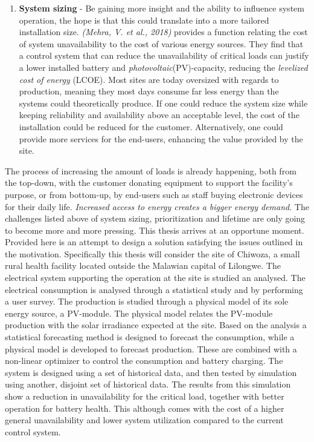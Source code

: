 \begin{enumerate}
    \item \textbf{System sizing}    -    Be gaining more insight and the ability to influence system operation, the hope is that this could translate into a more tailored installation size. \textit{(Mehra, V. et al., 2018)} provides a function relating the cost of system unavailability to the cost of various energy sources.\cite{Mehra2018-xs} They find that a control system that can reduce the unavailability of critical loads can justify a lower installed battery and \textit{photovoltaic}(PV)-capacity, reducing the \textit{levelized cost of energy} (LCOE). Most sites are today oversized with regards to production, meaning they most days consume far less energy than the systems could theoretically produce. If one could reduce the system size while keeping reliability and availability above an acceptable level, the cost of the installation could be reduced for the customer. Alternatively, one could provide more services for the end-users, enhancing the value provided by the site.
\end{enumerate}

The process of increasing the amount of loads is already happening, both from the top-down, with the customer donating equipment to support the facility's purpose, or from bottom-up, by end-users such as staff buying electronic devices for their daily life. \textit{Increased access to energy creates a bigger energy demand}. The challenges listed above of system sizing, prioritization and lifetime are only going to become more and more pressing. This thesis arrives at an opportune moment.\\


Provided here is an attempt to design a solution satisfying the issues outlined in the motivation. Specifically this thesis will consider the site of Chiwoza, a small rural health facility located outside the Malawian capital of Lilongwe. The electrical system supporting the operation at the site is studied an analysed. The electrical consumption is analysed through a statistical study and by performing a user survey. The production is studied through a physical model of its sole energy source, a PV-module. The physical model relates the PV-module production with the solar irradiance expected at the site. Based on the analysis a statistical forecasting method is designed to forecast the consumption, while a physical model is developed to forecast production. These are combined with a non-linear optimizer to control the consumption and battery charging. The system is designed using a set of historical data, and then tested by simulation using another, disjoint set of historical data. The results from this simulation show a reduction in unavailability for the critical load, together with better operation for battery health. This although comes with the cost of a higher general unavailability and lower system utilization compared to the current control system. 

